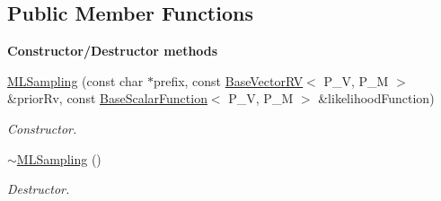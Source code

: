 \subsection*{Public Member Functions}
\begin{Indent}{\bf Constructor/\-Destructor methods}\par
\begin{DoxyCompactItemize}
\item 
\hyperlink{class_q_u_e_s_o_1_1_m_l_sampling_a7738e481975c7ca2a47fa763bb92bdbe}{M\-L\-Sampling} (const char $\ast$prefix, const \hyperlink{class_q_u_e_s_o_1_1_base_vector_r_v}{Base\-Vector\-R\-V}$<$ P\-\_\-\-V, P\-\_\-\-M $>$ \&prior\-Rv, const \hyperlink{class_q_u_e_s_o_1_1_base_scalar_function}{Base\-Scalar\-Function}$<$ P\-\_\-\-V, P\-\_\-\-M $>$ \&likelihood\-Function)
\begin{DoxyCompactList}\small\item\em Constructor. \end{DoxyCompactList}\item 
\hyperlink{class_q_u_e_s_o_1_1_m_l_sampling_ad3f442d1cac363497d04a4c8f8cf76c3}{$\sim$\-M\-L\-Sampling} ()
\begin{DoxyCompactList}\small\item\em Destructor. \end{DoxyCompactList}\end{DoxyCompactItemize}
\end{Indent}
